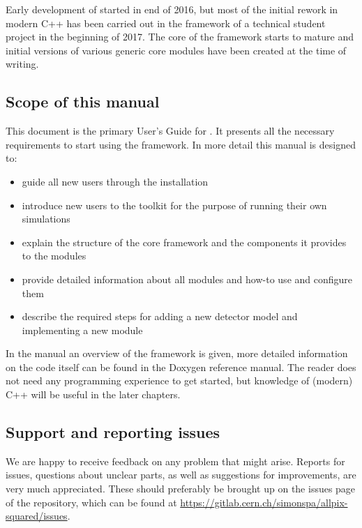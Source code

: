 Early development of \apsq started in end of 2016, but most of the initial rework in modern C++ has been carried out in the framework of a technical student project in the beginning of 2017. The core of the framework starts to mature and initial versions of various generic core modules have been created at the time of writing. 

\subsection{Scope of this manual}
This document is the primary User's Guide for \apsq. It presents all the necessary requirements to start using the framework. In more detail this manual is designed to:
\begin{itemize}
\item guide all new users through the installation 
\item introduce new users to the toolkit for the purpose of running their own simulations
\item explain the structure of the core framework and the components it provides to the modules
\item provide detailed information about all modules and how-to use and configure them
\item describe the required steps for adding a new detector model and implementing a new module
\end{itemize}

In the manual an overview of the framework is given, more detailed information on the code itself can be found in the Doxygen reference manual. The reader does not need any programming experience to get started, but knowledge of (modern) C++ will be useful in the later chapters.

\subsection{Support and reporting issues}
We are happy to receive feedback on any problem that might arise. Reports for issues, questions about unclear parts, as well as suggestions for improvements, are very much appreciated. These should preferably be brought up on the issues page of the repository, which can be found at \url{https://gitlab.cern.ch/simonspa/allpix-squared/issues}.

